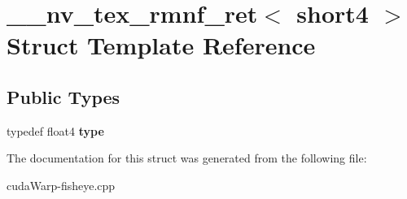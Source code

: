 \hypertarget{struct____nv__tex__rmnf__ret_3_01short4_01_4}{}\section{\+\_\+\+\_\+nv\+\_\+tex\+\_\+rmnf\+\_\+ret$<$ short4 $>$ Struct Template Reference}
\label{struct____nv__tex__rmnf__ret_3_01short4_01_4}
\subsection*{Public Types}
\begin{DoxyCompactItemize}
\item 
typedef float4 {\bfseries type}\hypertarget{struct____nv__tex__rmnf__ret_3_01short4_01_4_ad3b5e591b872263794e5884b7acdd2f1}{}\label{struct____nv__tex__rmnf__ret_3_01short4_01_4_ad3b5e591b872263794e5884b7acdd2f1}

\end{DoxyCompactItemize}


The documentation for this struct was generated from the following file\+:\begin{DoxyCompactItemize}
\item 
cuda\+Warp-\/fisheye.\+cpp\end{DoxyCompactItemize}
